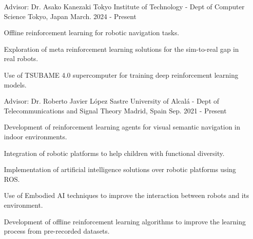 

\begin{cventries}

    \cventry
    {Advisor: Dr. Asako Kanezaki} %
    {Tokyo Institute of Technology - Dept of Computer Science} %
    {Tokyo, Japan} %
    {March. 2024 - Present} %
    {
        \begin{cvitems} %
            \item {Offline reinforcement learning for robotic navigation tasks.}
            \item {Exploration of meta reinforcement learning solutions for the sim-to-real gap in real robots.}
            \item {Use of TSUBAME 4.0 supercomputer for training deep reinforcement learning models.}
        \end{cvitems}
    }

    \cventry
    {Advisor: Dr. Roberto Javier López Sastre} %
    {University of Alcalá - Dept of Telecommunications and Signal Theory} %
    {Madrid, Spain} %
    {Sep. 2021 - Present} %
    {
        \begin{cvitems} %
            \item {Development of reinforcement learning agents for visual semantic navigation in indoor environments.}
            \item {Integration of robotic platforms to help children with functional diversity.}
            \item {Implementation of artificial intelligence solutions over robotic platforms using ROS.}
            \item {Use of Embodied AI techniques to improve the interaction between robots and its environment.}
            \item {Development of offline reinforcement learning algorithms to improve the learning process from pre-recorded datasets.}
        \end{cvitems}
    }


\end{cventries}
